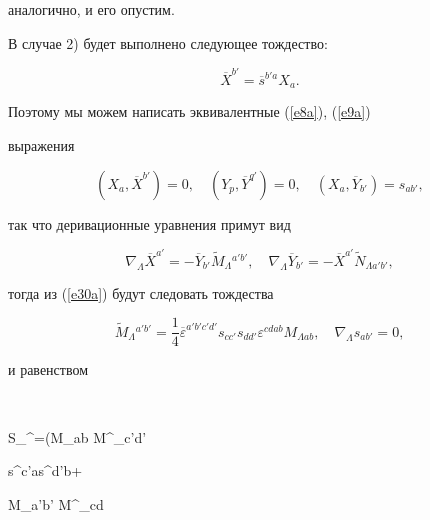 аналогично, и его опустим.


В случае 2) будет выполнено следующее тождество:


$$




\overline X^{b'}=\overline s^{b'a}X_a.


$$


Поэтому мы можем написать эквивалентные (\ref{e8a}), (\ref{e9a})


выражения


\begin{equation}


\label{e30a}


(X_a,\overline X^{b'})=0,\quad (Y_p,\overline Y^{q'})=0,\quad


(X_a,\overline Y_{b'})=s_{ab'},


\end{equation}


так что деривационные уравнения примут вид


$$




\nabla_\Lambda\overline X^{a'} = -\overline Y_{b'}


\widetilde M_\Lambda{}^{a'b'},\quad


\nabla_\Lambda \overline Y_{b'} = -\overline X^{a'}


\widetilde N_{\Lambda a'b'},


$$


тогда из (\ref{e30a}) будут следовать тождества


\begin{equation}


\label{e32a}


\widetilde M_\Lambda{}^{a'b'}=\frac{1}{4}\overline\varepsilon^{a'b'c'd'}


s_{cc'}s_{dd'}\varepsilon^{cdab}M_{\Lambda ab},\quad


\nabla_\Lambda s_{ab'}=0,


\end{equation}


и равенством


$$




S_\Lambda{}^\Theta=(M_{\Lambda ab} \overline M^\Theta{}_{c'd'}


\overline s^{c'a}\overline s^{d'b}+


\overline M_{\Lambda a'b'} M^\Theta{}_{cd}


